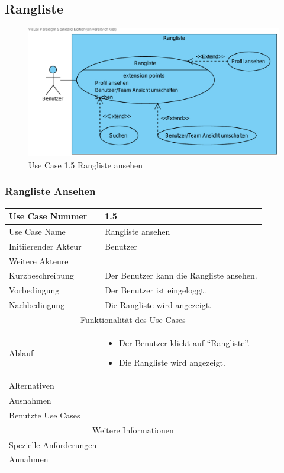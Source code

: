 \documentclass[10pt,a4paper]{article}
\begin{document}
\subsection{Rangliste}
	\begin{figure}[H]
	\centering
		\includegraphics[width=\linewidth]{gfx/webseite/rangliste.pdf}
                \caption{Use Case 1.5 Rangliste ansehen}
        \end{figure}

\subsubsection{Rangliste Ansehen}
	\begin{tabularx}{\textwidth}{|l|X|}
	\hline Use Case Nummer & 1.5 \\ 
	\hline Use Case Name & Rangliste ansehen \\ 
	\hline Initiierender Akteur & Benutzer \\
	\hline Weitere Akteure &  \\
	\hline Kurzbeschreibung & Der Benutzer kann die Rangliste ansehen. \\
	\hline Vorbedingung & Der Benutzer ist eingeloggt. \\
	\hline Nachbedingung & Die Rangliste wird angezeigt. \\
	\hline \multicolumn{2}{|c|}{Funktionalität des Use Cases}\\
	\hline Ablauf & \begin{itemize}
                \item Der Benutzer klickt auf ``Rangliste''. 
                \item Die Rangliste wird angezeigt.
                \end{itemize}\\
	\hline Alternativen & \\
	\hline Ausnahmen &  \\
	\hline Benutzte Use Cases &  \\
	\hline \multicolumn{2}{|c|}{Weitere Informationen} \\
	\hline Spezielle Anforderungen &  \\
	\hline Annahmen &  \\
	\hline
	\end{tabularx}
        
\end{document}

